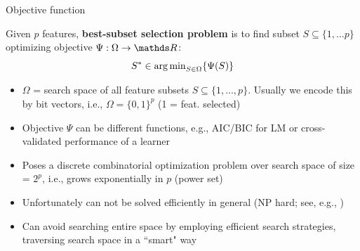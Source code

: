 \documentclass[11pt,compress,t,notes=noshow, xcolor=table]{beamer}
\begin{document}
  \begin{vbframe}{Objective function}


    Given $p$ features, \textbf{best-subset selection problem} is to find subset $S \subseteq \{ 1, \dots p \}$ optimizing objective $\Psi: \Omega \rightarrow \R$:
    \vspace{-0.15cm}
    $$S^{*}  \in \operatorname{arg\,min}_{{S \in \Omega}} \{ \Psi(S) \}$$
    \vspace{-0.8cm}
    \begin{itemize}
    \setlength{\itemsep}{0.8em}
     \item $\Omega$  = search space of all feature subsets $S\subseteq\{ 1, \dots, p \}$. Usually we encode this by
      bit vectors, i.e., $\Omega = \{0, 1\}^p$ (1 = feat. selected)
     \item Objective $\Psi$ can be different functions, e.g., AIC/BIC for LM or cross-validated performance of a learner
     \item Poses a discrete combinatorial optimization problem over search space of size = $2^p$, i.e., grows exponentially in $p$ (power set)%
     \item Unfortunately can not be solved efficiently in general (NP hard; see, e.g., )
     \item Can avoid searching entire space by employing efficient search strategies, traversing search space in a ``smart" way %

    \end{itemize}

  \end{vbframe}


\end{document}
